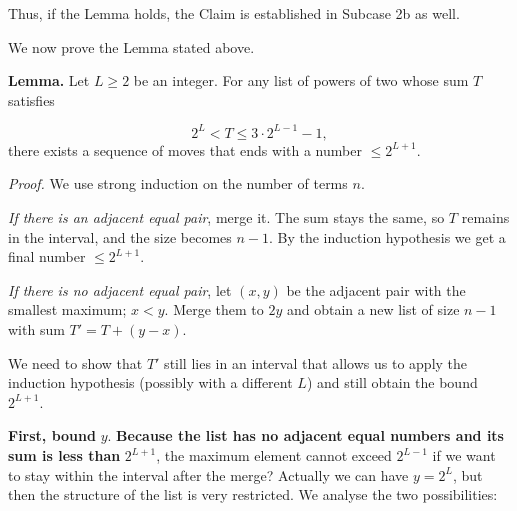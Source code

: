 Thus, if the Lemma holds, the Claim is established in Subcase 2b as well.\par
\smallskip
{}
We now prove the Lemma stated above.\par
\textbf{Lemma.} Let \(L \ge 2\) be an integer. For any list of powers of two whose sum \(T\) satisfies\par
\[
2^{L} < T \le 3 \cdot 2^{L-1} - 1,
\]
there exists a sequence of moves that ends with a number \(\le 2^{L+1}\).\par
\emph{Proof.} We use strong induction on the number of terms \(n\).\par
{}
\emph{If there is an adjacent equal pair}, merge it.  The sum stays the same, so \(T\) remains in the interval, and the size becomes \(n-1\).  By the induction hypothesis we get a final number \(\le 2^{L+1}\).\par
\emph{If there is no adjacent equal pair}, let \((x, y)\) be the adjacent pair with the smallest maximum; \(x < y\).  Merge them to \(2y\) and obtain a new list of size \(n-1\) with sum \(T' = T + (y - x)\).\par
We need to show that \(T'\) still lies in an interval that allows us to apply the induction hypothesis (possibly with a different \(L\)) and still obtain the bound \(2^{L+1}\).\par
\textbf{First, bound }\(y\).\textbf{ Because the list has no adjacent equal numbers and its sum is less than }\(2^{L+1}\), the maximum element cannot exceed \(2^{L-1}\) if we want to stay within the interval after the merge? Actually we can have \(y = 2^{L}\), but then the structure of the list is very restricted. We analyse the two possibilities:\par
